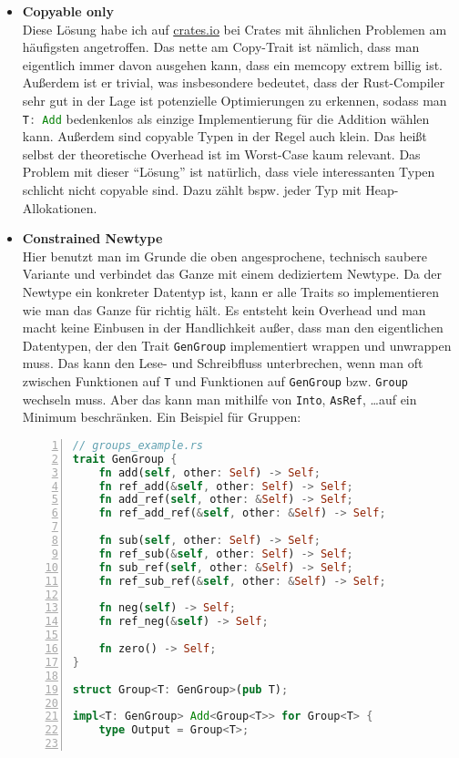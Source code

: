 \documentclass[12pt]{article}
\begin{document}
\begin{itemize}
\item \textbf{Copyable only}\\
Diese Lösung habe ich auf \href{https://crates.io}{crates.io} bei Crates mit ähnlichen Problemen am häufigsten angetroffen. Das nette am Copy-Trait ist nämlich, dass man eigentlich immer davon ausgehen kann, dass ein memcopy extrem billig ist. Außerdem ist er trivial, was insbesondere bedeutet, dass der Rust-Compiler sehr gut in der Lage ist potenzielle Optimierungen zu erkennen, sodass man \lstinline[language=Rust]|T: Add| bedenkenlos als einzige Implementierung für die Addition wählen kann. Außerdem sind copyable Typen in der Regel auch klein. Das heißt selbst der theoretische Overhead ist im Worst-Case kaum relevant. Das Problem mit dieser ``Lösung'' ist natürlich, dass viele interessanten Typen schlicht nicht copyable sind. Dazu zählt bspw. jeder Typ mit Heap-Allokationen.
\item \textbf{Constrained Newtype}\\
Hier benutzt man im Grunde die oben angesprochene, technisch saubere Variante und verbindet das Ganze mit einem dediziertem Newtype. Da der Newtype ein konkreter Datentyp ist, kann er alle Traits so implementieren wie man das Ganze für richtig hält. Es entsteht kein Overhead und man macht keine Einbusen in der Handlichkeit außer, dass man den eigentlichen Datentypen, der den Trait \texttt{GenGroup} implementiert wrappen und unwrappen muss. Das kann den Lese- und Schreibfluss unterbrechen, wenn man oft zwischen Funktionen auf \texttt{T} und Funktionen auf \texttt{GenGroup} bzw. \texttt{Group} wechseln muss. Aber das kann man mithilfe von \texttt{Into}, \texttt{AsRef}, \dots auf ein Minimum beschränken. Ein Beispiel für Gruppen:
\begin{lstlisting}[language=Rust, numbers=left]
// groups_example.rs
trait GenGroup {
	fn add(self, other: Self) -> Self;
	fn ref_add(&self, other: Self) -> Self;
	fn add_ref(self, other: &Self) -> Self;
	fn ref_add_ref(&self, other: &Self) -> Self;
	
	fn sub(self, other: Self) -> Self;
	fn ref_sub(&self, other: Self) -> Self;
	fn sub_ref(self, other: &Self) -> Self;
	fn ref_sub_ref(&self, other: &Self) -> Self;
	
	fn neg(self) -> Self;
	fn ref_neg(&self) -> Self;
	
	fn zero() -> Self;
}

struct Group<T: GenGroup>(pub T);

impl<T: GenGroup> Add<Group<T>> for Group<T> {
	type Output = Group<T>;
	

\end{lstlisting}
\end{itemize}
\end{document}
